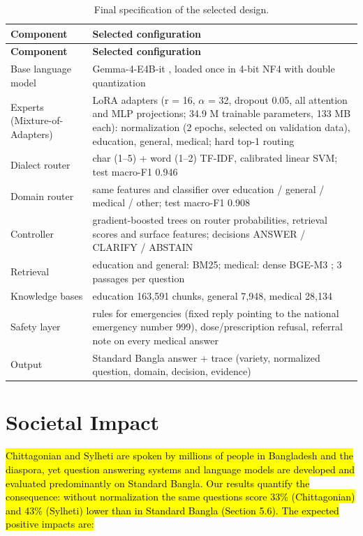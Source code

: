 \begin{longtable}{@{}p{}p{}@{}}
\caption{Final specification of the selected design.}\label{tab:final-design}\\
\toprule
\textbf{Component} & \textbf{Selected configuration} \\
\midrule
\endfirsthead
\toprule
\textbf{Component} & \textbf{Selected configuration} \\
\midrule
\endhead
\bottomrule
\endfoot
Base language model & Gemma-4-E4B-it \cite{gemma4}, loaded once in 4-bit NF4 with double quantization \\
Experts (Mixture-of-Adapters) & LoRA adapters \cite{hu2022lora} (r = 16, \ensuremath{\alpha} = 32, dropout 0.05, all attention and MLP projections; 34.9 M trainable parameters, 133 MB each): normalization (2 epochs, selected on validation data), education, general, medical; hard top-1 routing \\
Dialect router & char (1--5) + word (1--2) TF-IDF, calibrated linear SVM; test macro-F1 0.946 \\
Domain router & same features and classifier over education / general / medical / other; test macro-F1 0.908 \\
Controller & gradient-boosted trees on router probabilities, retrieval scores and surface features; decisions ANSWER / CLARIFY / ABSTAIN \\
Retrieval & education and general: BM25; medical: dense BGE-M3 \cite{chen2024bgem3}; 3 passages per question \\
Knowledge bases & education 163,591 chunks, general 7,948, medical 28,134 \\
Safety layer & rules for emergencies (fixed reply pointing to the national emergency number 999), dose/prescription refusal, referral note on every medical answer \\
Output & Standard Bangla answer + trace (variety, normalized question, domain, decision, evidence) \\
\bottomrule
\end{longtable}

\section{Societal Impact}\label{societal-impact}

\hl{Chittagonian and Sylheti are spoken by millions of people in
Bangladesh and the diaspora, yet question answering systems and language
models are developed and evaluated predominantly on Standard Bangla. Our
results quantify the consequence: without normalization the same
questions score 33\% (Chittagonian) and 43\% (Sylheti) lower than in
Standard Bangla (Section 5.6). The expected positive impacts are:}

